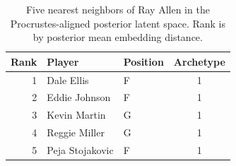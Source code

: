 \begin{table}[htbp]
  \centering\small
  \begin{tabular}{rllc}
    \toprule
    Rank & Player & Position & Archetype \\
    \midrule
    1 & Dale Ellis & F & 1 \\
    2 & Eddie Johnson & F & 1 \\
    3 & Kevin Martin & G & 1 \\
    4 & Reggie Miller & G & 1 \\
    5 & Peja Stojakovic & F & 1 \\
    \bottomrule
  \end{tabular}
  \caption{Five nearest neighbors of Ray Allen in the Procrustes-aligned posterior latent space. Rank is by posterior mean embedding distance.}
  \label{tab:Ray_Allen_neighbors}
\end{table}


